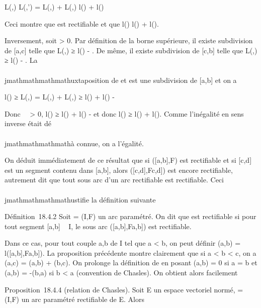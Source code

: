 L(\Gamma,\sigma) \leq L(\Gamma,\sigma') = L(,) +
L(,) \leq l() + l()

Ceci montre que \Gamma est rectifiable et que l(\Gamma) \leq l() +
l().

Inversement, soit \epsilon \textgreater{} 0. Par définition de la borne
supérieure, il existe  subdivision de {[}a,c{]} telle que
L(,) ≥ l() - \epsilon
{} . De même, il existe  subdivision
de {[}c,b{]} telle que L(,) ≥ l()
- \epsilon {} . La \\\\jmathmathmathmathuxtaposition \sigma de  et
 est une subdivision de {[}a,b{]} et on a

l(\Gamma) ≥ L(\Gamma,\sigma) = L(,) +
L(,) ≥ l() + l() - \epsilon

Donc \forall~~\epsilon \textgreater{} 0, l(\Gamma) ≥
l() + l() - \epsilon et donc l(\Gamma) ≥ l() +
l(). Comme l'inégalité en sens inverse était dé\\\\jmathmathmathmathà connue, on
a l'égalité.

On déduit immédiatement de ce résultat que si ({[}a,b{]},F) est
rectifiable et si {[}c,d{]} est un segment contenu dans {[}a,b{]}, alors
({[}c,d{]},F\textbar{}{[}c,d{]}) est encore
rectifiable, autrement dit que tout sous arc d'un arc rectifiable est
rectifiable. Ceci \\\\jmathmathmathmathustifie la définition suivante

Définition~18.4.2 Soit \Gamma = (I,F) un arc paramétré. On dit que \Gamma est
rectifiable si pour tout segment {[}a,b{]} \subset~ I, le sous arc
({[}a,b{]},F\textbar{}{[}a,b{]}) est rectifiable.

Dans ce cas, pour tout couple a,b de I tel que a \textless{} b, on peut
définir \ell\Gamma(a,b) =
l({[}a,b{]},F\textbar{}{[}a,b{]}). La proposition
précédente montre clairement que si a \textless{} b \textless{} c, on a
\ell\Gamma(a,c) = \ell\Gamma(a,b) + \ell\Gamma(b,c). On prolonge
la définition de \ell\Gamma en posant \ell\Gamma(a,b) = 0 si a = b
et \ell\Gamma(a,b) = -\ell\Gamma(b,a) si b \textless{} a (convention
de Chasles). On obtient alors facilement

Proposition~18.4.4 (relation de Chasles). Soit E un espace vectoriel
normé, \Gamma = (I,F) un arc paramétré rectifiable de E. Alors

